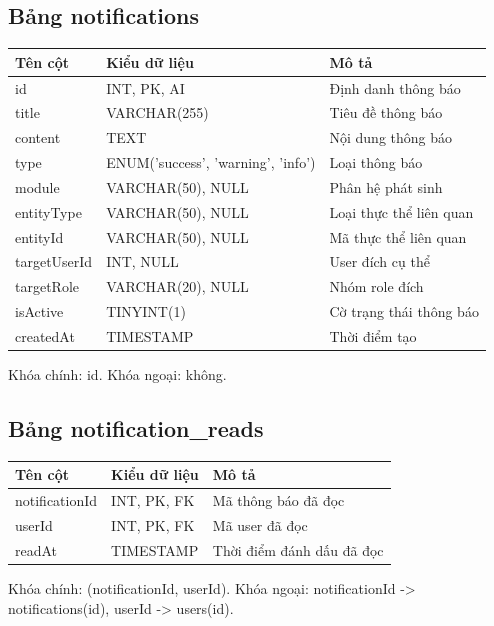 \documentclass[18pt,a4paper]{report}
\begin{document}
\subsection{Bảng notifications}
\begin{longtable}{|>{\raggedright\arraybackslash}p{4.5cm}|>{\raggedright\arraybackslash}p{4.5cm}|>{\raggedright\arraybackslash}p{6.5cm}|}
\hline
\textbf{Tên cột} & \textbf{Kiểu dữ liệu} & \textbf{Mô tả} \\ \hline
id & INT, PK, AI & Định danh thông báo \\ \hline
title & VARCHAR(255) & Tiêu đề thông báo \\ \hline
content & TEXT & Nội dung thông báo \\ \hline
type & ENUM('success', 'warning', 'info') & Loại thông báo \\ \hline
module & VARCHAR(50), NULL & Phân hệ phát sinh \\ \hline
entityType & VARCHAR(50), NULL & Loại thực thể liên quan \\ \hline
entityId & VARCHAR(50), NULL & Mã thực thể liên quan \\ \hline
targetUserId & INT, NULL & User đích cụ thể \\ \hline
targetRole & VARCHAR(20), NULL & Nhóm role đích \\ \hline
isActive & TINYINT(1) & Cờ trạng thái thông báo \\ \hline
createdAt & TIMESTAMP & Thời điểm tạo \\ \hline
\end{longtable}
Khóa chính: id. Khóa ngoại: không.

\subsection{Bảng notification\_reads}
\begin{longtable}{|>{\raggedright\arraybackslash}p{4.5cm}|>{\raggedright\arraybackslash}p{4.5cm}|>{\raggedright\arraybackslash}p{6.5cm}|}
\hline
\textbf{Tên cột} & \textbf{Kiểu dữ liệu} & \textbf{Mô tả} \\ \hline
notificationId & INT, PK, FK & Mã thông báo đã đọc \\ \hline
userId & INT, PK, FK & Mã user đã đọc \\ \hline
readAt & TIMESTAMP & Thời điểm đánh dấu đã đọc \\ \hline
\end{longtable}
Khóa chính: (notificationId, userId). Khóa ngoại: notificationId -> notifications(id), userId -> users(id).
\end{document}
